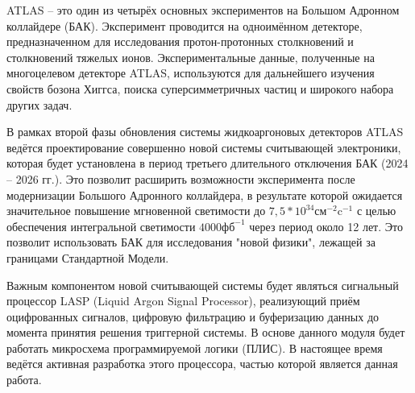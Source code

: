 ATLAS -- это один из четырёх основных экспериментов на Большом Адронном коллайдере (БАК). Эксперимент проводится на одноимённом детекторе, предназначенном для исследования протон-протонных столкновений и столкновений тяжелых ионов. Экспериментальные данные, полученные на многоцелевом детекторе ATLAS, используются для дальнейшего изучения свойств бозона Хиггса, поиска суперсимметричных частиц и широкого набора других задач.\par

В рамках второй фазы обновления системы жидкоаргоновых детекторов ATLAS ведётся проектирование совершенно новой системы считывающей электроники, которая будет установлена в период третьего длительного отключения БАК (2024 -- 2026 гг.). Это позволит расширить возможности эксперимента после модернизации Большого Адронного коллайдера, в результате которой ожидается значительное повышение мгновенной светимости до $7,5*10^{34} \text{см}^{-2}\text{c}^{-1}$ с целью обеспечения интегральной светимости $4000 \text{фб}^{-1}$ через период около 12 лет. Это позволит использовать БАК для исследования "новой физики", лежащей за границами Стандартной Модели.\par

Важным компонентом новой считывающей системы будет являться сигнальный процессор LASP (Liquid Argon Signal Processor), реализующий приём оцифрованных сигналов, цифровую фильтрацию и буферизацию данных до момента принятия решения триггерной системы. В основе данного модуля будет работать микросхема программируемой логики (ПЛИС). В настоящее время ведётся активная разработка этого процессора, частью которой является данная работа.\par
